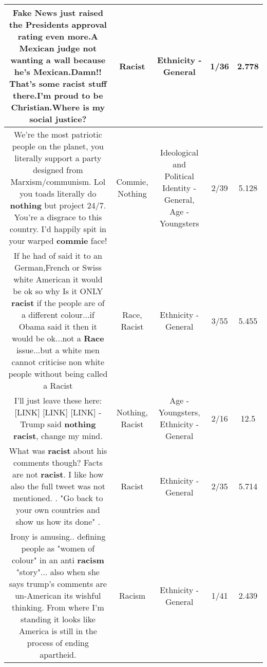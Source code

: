 \documentclass[11pt]{article}
\newlength\mylength
\begin{document}
\begin{center}
\begin{longtable}{|C{.65\mylength}|C{.30\mylength}|C{.12\mylength}|C{.12\mylength}|C{.12\mylength}|}
  \small Fake News just raised the Presidents approval rating even more.A Mexican judge not wanting a wall because he's Mexican.Damn!! That's some \textbf{racist} stuff there.I'm proud to be Christian.Where is my social justice?\normalsize   & Racist & Ethnicity - General & 1/36 & 2.778 \\  \hline
  \small We're the most patriotic people on the planet, you literally support a party designed from Marxism/communism. Lol you toads literally do \textbf{nothing} but project 24/7. You're a disgrace to this country. I'd happily spit in your warped \textbf{commie} face!\normalsize   & Commie, Nothing &  Ideological and Political Identity - General, Age - Youngsters & 2/39 & 5.128 \\  \hline
  \small If he had of said it to an German,French or Swiss white American it would be ok so why Is it ONLY \textbf{racist} if the people are of a different colour...if Obama said it then it would be ok...not a \textbf{Race} issue...but a white men cannot criticise non white people without being called a Racist\normalsize   & Race, Racist & Ethnicity - General & 3/55 & 5.455 \\  \hline
  \small I'll just leave these here:   [LINK] [LINK]    [LINK]   - Trump said \textbf{nothing} \textbf{racist}, change my mind.\normalsize   & Nothing, Racist & Age - Youngsters, Ethnicity - General & 2/16 & 12.5 \\  \hline
  \small What was \textbf{racist} about his comments though? Facts are not \textbf{racist}.  I like how also the full tweet was not mentioned. . "Go back to your own countries and show us how its done" .\normalsize   & Racist & Ethnicity - General & 2/35 & 5.714 \\  \hline
  \small Irony is amusing.. defining people as "women of colour" in an anti \textbf{racism} "story"... also when she says trump's comments are un-American its wishful thinking. From where I'm standing it looks like America is still in the process of ending apartheid.\normalsize   & Racism & Ethnicity - General & 1/41 & 2.439 \\  \hline

\end{longtable}
\end{center}
\end{document}
